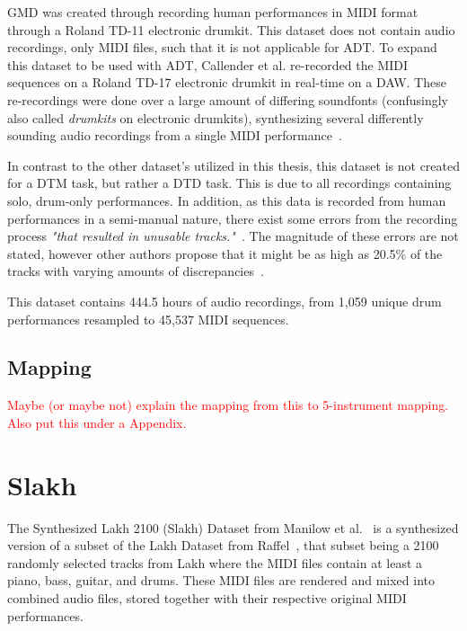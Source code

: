 GMD was created through recording human performances in MIDI format through a Roland TD-11 electronic drumkit. This dataset does not contain audio recordings, only MIDI files, such that it is not applicable for \gls{ADT}. To expand this dataset to be used with \gls{ADT}, Callender et al. re-recorded the MIDI sequences on a Roland TD-17 electronic drumkit in real-time on a \gls{DAW}. These re-recordings were done over a large amount of differing soundfonts (confusingly also called \textit{drumkits} on electronic drumkits), synthesizing several differently sounding audio recordings from a single MIDI performance~\cite{pmlr-v97-gillick19a, callender2020improvingperceptualqualitydrum}.

In contrast to the other dataset's utilized in this thesis, this dataset is not created for a \gls{DTM} task, but rather a \gls{DTD} task. This is due to all recordings containing solo, drum-only performances. In addition, as this data is recorded from human performances in a semi-manual nature, there exist some errors from the recording process \textit{"that resulted in unusable tracks."}~\cite{callender2020improvingperceptualqualitydrum}. The magnitude of these errors are not stated, however other authors propose that it might be as high as 20.5\% of the tracks with varying amounts of discrepancies~\cite{holz2021automatic}.

This dataset contains 444.5 hours of audio recordings, from 1,059 unique drum performances resampled to 45,537 MIDI sequences.

\subsection{Mapping}

\textcolor{red}{Maybe (or maybe not) explain the mapping from this to 5-instrument mapping. Also put this under a Appendix.}

\section{Slakh}

The Synthesized Lakh 2100 (Slakh) Dataset from Manilow et al.~\cite{8937170} is a synthesized version of a subset of the Lakh Dataset from Raffel~\cite{raffel2016learning}, that subset being a 2100 randomly selected tracks from Lakh where the MIDI files contain at least a piano, bass, guitar, and drums. These MIDI files are rendered and mixed into combined audio files, stored together with their respective original MIDI performances.

